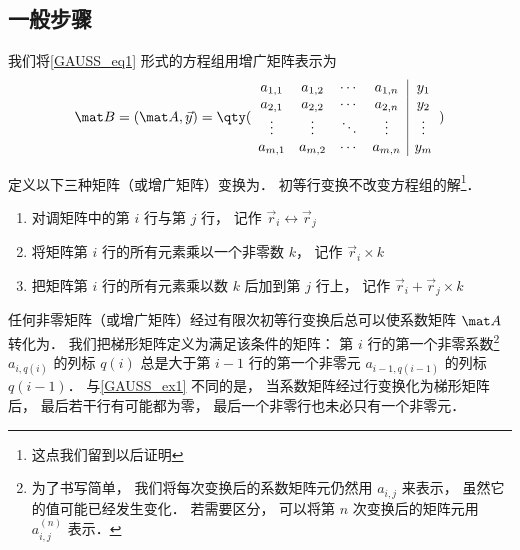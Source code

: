 \subsection{一般步骤}

我们将\autoref{GAUSS_eq1} 形式的方程组用增广矩阵表示为
\begin{equation}
\mat B=(\mat A ,\vec y)={
	\qty( \begin{array}{cccc|c}
	a_{1,1} &a_{1,2} &\cdots &a_{1,n} &y_1 \\
	a_{2,1} &a_{2,2} &\cdots &a_{2,n} &y_2 \\
	\vdots  &\vdots  &\ddots &\vdots  &\vdots \\
	a_{m,1} &a_{m,2} &\cdots &a_{m,n} &y_m \\
	\end{array} 
	)}
\end{equation}

定义以下三种矩阵（或增广矩阵）变换为． 初等行变换不改变方程组的解\footnote{这点我们留到以后证明}．%
\begin{enumerate}
\item 对调矩阵中的第 $i$ 行与第 $j$ 行， 记作 $\vec r_i \leftrightarrow \vec r_j$

\item 将矩阵第 $i$ 行的所有元素乘以一个非零数 $k$， 记作 $\vec r_i \times k$

\item 把矩阵第 $i$ 行的所有元素乘以数 $k$ 后加到第 $j$ 行上， 记作 $\vec r_i + \vec r_j \times k$
\end{enumerate}

任何非零矩阵（或增广矩阵）经过有限次初等行变换后总可以使系数矩阵 $\mat A$ 转化为． 我们把梯形矩阵定义为满足该条件的矩阵： 第 $i$ 行的第一个非零系数\footnote{为了书写简单， 我们将每次变换后的系数矩阵元仍然用 $a_{i,j}$ 来表示， 虽然它的值可能已经发生变化． 若需要区分， 可以将第 $n$ 次变换后的矩阵元用 $a_{i,j}^{(n)}$ 表示．} $a_{i,q(i)}$ 的列标 $q(i)$ 总是大于第 $i-1$ 行的第一个非零元 $a_{i-1, q(i-1)}$ 的列标 $q(i-1)$． 与\autoref{GAUSS_ex1} 不同的是， 当系数矩阵经过行变换化为梯形矩阵后， 最后若干行有可能都为零， 最后一个非零行也未必只有一个非零元．

